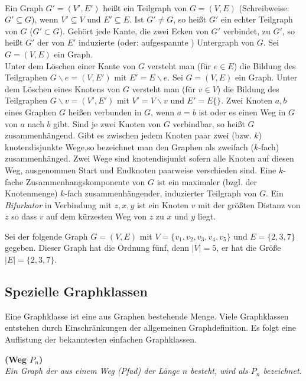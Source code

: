 \\Ein Graph $G'=(V',E')$ heißt ein Teilgraph von $G=(V,E)$ (Schreibweise: $G'\subseteq G$), wenn $V'\subseteq V$ und $E'\subseteq E$. Ist $G' \neq G$, so heißt $G'$ ein echter Teilgraph von $G$ ($G' \subset G$). Gehört jede Kante, die zwei Ecken von $G'$ verbindet, zu $G'$, so heißt $G'$ der von $E'$ induzierte (oder: aufgespannte ) Untergraph von $G$. Sei $G=(V,E)$ ein Graph.\\Unter dem Löschen einer Kante von $G$ versteht man (für $e \in E$) die Bildung des Teilgraphen $G \backslash e = (V, E')$ mit $E'=E  \backslash e$. Sei $G=(V,E)$ ein Graph. Unter dem Löschen eines Knotens von $G$ versteht man (für $v \in V$) die Bildung des Teilgraphen $G \backslash v = (V', E')$ mit $V'=V  \backslash v$ und $E'=E\{\}$. Zwei Knoten $a, b$ eines Graphen $G$ heißen verbunden in $G$, wenn $a = b$ ist oder es einen Weg in $G$ von $a$ nach $b$ gibt. Sind je zwei Knoten von $G$ verbindbar, so heißt $G$ zusammenhängend. Gibt es zwischen jedem Knoten paar zwei (bzw. $k$) knotendisjunkte Wege,so bezeichnet man den Graphen als zweifach ($k$-fach) zusammenhänged. Zwei Wege sind knotendisjunkt sofern alle Knoten auf diesen Weg, ausgenommen Start und Endknoten paarweise verschieden sind. Eine $k$-fache Zusammenhangskomponente von $G$ ist ein maximaler (bzgl. der Knotenmenge) $k$-fach zusammenhängender, induzierter Teilgraph von $G$.  Ein \emph{Bifurkator} in Verbindung mit $z, x, y$ ist ein Knoten $v$ mit der größten Distanz von $z$ so dass $v$ auf dem kürzesten Weg von $z$ zu $x$ und $y$ liegt.
\begin{bsp}
Sei der folgende Graph $G=(V,E)$ mit $V=\{v_1,v_2,v_3,v_4,v_5\}$ und $E=\{2,3,7\}$ gegeben. Dieser Graph hat die Ordnung fünf, denn $|V|=5$, er hat die Größe $|E|=\{2,3,7\}$.\\
\end{bsp}
\newpage
\subsection{Spezielle Graphklassen}
Eine Graphklasse ist eine aus Graphen bestehende Menge. Viele Graphklassen entstehen durch Einschränkungen der allgemeinen Graphdefinition. Es folgt eine Auflistung der bekanntesten einfachen Graphklassen.
\begin{defi}{\textbf{(Weg $P_n$)}}\\
\emph{Ein Graph der aus einem Weg (Pfad) der Länge $n$ besteht, wird als $P_n$ bezeichnet.} \end{defi}


